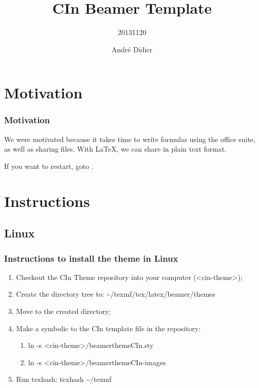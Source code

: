 \documentclass{beamer}
\title{CIn Beamer Template}
\subtitle{20131120}
\author{André Didier}
\institute{
\inst{1}Federal University of Pernambuco\\
Centre of Informatics
}
\begin{document}
\begin{frame}[label=title]
\titlepage
\end{frame}

\section{Motivation}

\begin{frame}
\frametitle{Motivation}
We were motivated because it takes time to write formulas using the office
suite, as well as sharing files. With LaTeX, we can share in plain text format.

If you want to restart, goto \hyperlink{title}{}.


\end{frame}

\section{Instructions}
\subsection{Linux}

\begin{frame}
\frametitle{Instructions to install the theme in Linux}

\begin{enumerate}
    \item Checkout the CIn Theme repository into your computer
    (<cin-theme>);
    \item Create the directory tree to: \~{}/texmf/tex/latex/beamer/themes
    \item Move to the created directory;
    \item Make a symbolic to the CIn template file in the repository:
    \begin{enumerate}
        \item ln -s <cin-theme>/beamerthemeCIn.sty
        \item ln -s <cin-theme>/beamerthemeCIn-images
    \end{enumerate}
    \item Run texhash: texhash \~{}/texmf
\end{enumerate}


\end{frame}
\end{document}
